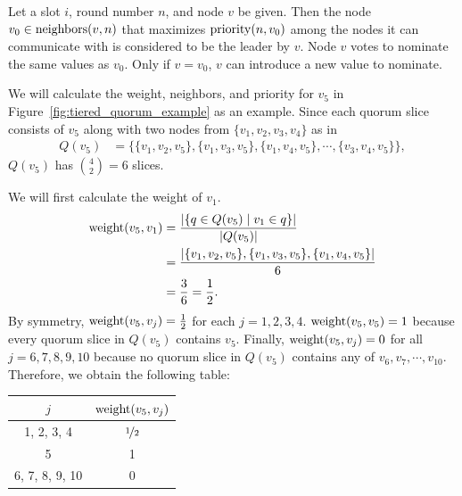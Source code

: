 \begin{defn}[Leader]
    Let a slot $i$, round number $n$, and node $v$ be given.
    Then the node $v_0 \in \operatorname{neighbors}(v, n)$ that maximizes $\operatorname{priority}(n, v_0)$ among the nodes it can communicate with is considered to be the leader by $v$.
    Node $v$ votes to nominate the same values as $v_0$.
    Only if $v = v_0$, $v$ can introduce a new value to nominate.
\end{defn}

\begin{exmp}
    We will calculate the weight, neighbors, and priority for $v_5$ in Figure~\ref{fig:tiered_quorum_example} as an example.
    Since each quorum slice consists of $v_5$ along with two nodes from $\{ v_1, v_2, v_3, v_4 \}$ as in
    \begin{align*}
        Q(v_5) &= \{ \{ v_1, v_2, v_5 \}, \{ v_1, v_3, v_5 \}, \{ v_1, v_4, v_5 \}, \cdots, \{ v_3, v_4, v_5 \} \},
    \end{align*}
    $Q(v_5)$ has $\binom{4}{2} = 6$ slices.

    We will first calculate the weight of $v_1$.
    \begin{align*}
        \operatorname{weight}(v_5, v_1)
            &= \frac{\abs{\{ q \in Q(v_5) \mid v_1 \in q \}}}{\abs{Q(v_5)}} \\
            &= \frac{\abs{ \{ v_1, v_2, v_5 \}, \{ v_1, v_3, v_5 \}, \{ v_1, v_4, v_5 \}}}{6} \\
            &= \frac{3}{6} = \frac{1}{2}.
    \end{align*}
    By symmetry, $\operatorname{weight}(v_5, v_j) = \frac{1}{2}$ for each $j = 1, 2, 3, 4$.
    $\operatorname{weight}(v_5, v_5) = 1$ because every quorum slice in $Q(v_5)$ contains $v_5$.
    Finally, $\operatorname{weight}(v_5, v_j) = 0$ for all $j = 6, 7, 8, 9, 10$ because no quorum slice in $Q(v_5)$ contains any of $v_6, v_7, \cdots, v_{10}$.
    Therefore, we obtain the following table:
    \begin{center}
      \begin{tabular}{ | c | c | }
        \hline
          $j$ & $\operatorname{weight}(v_5, v_j)$ \\ \hline
          1, 2, 3, 4 & $\nicefrac{1}{2}$ \\ \hline 
          5 & 1 \\ \hline 
          6, 7, 8, 9, 10 & 0 \\
        \hline
      \end{tabular}
    \end{center}


\end{exmp}
